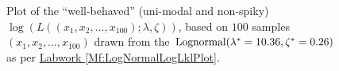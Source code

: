 \begin{figure}[hbpt]
\caption{Plot of the ``well-behaved'' (uni-modal and non-spiky) $\log(L((x_1,x_2,\ldots,x_{100});\lambda,\zeta))$, based on $100$ samples $(x_1,x_2,\ldots,x_{100})$ drawn from the $\mbox{{\rm Lognormal}}(\lambda^*=10.36,\zeta^*=0.26)$ as per \hyperref[Mf:LogNormalLogLklPlot]{Labwork \ref*{Mf:LogNormalLogLklPlot}}.\label {F:LogNormalLogLklPlot}}
\begin{center}
\end{center}
\end{figure}

